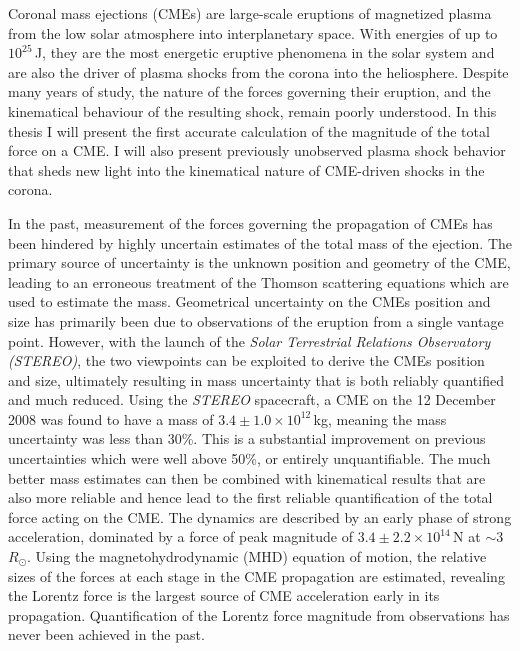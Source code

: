 
\begin{abstracts} 

Coronal mass ejections (CMEs) are large-scale eruptions of magnetized plasma from the low solar atmosphere into interplanetary space. With energies of up to $10^{25}$\,J, they are the most energetic eruptive phenomena in the solar system and are also the driver of plasma shocks from the corona into the heliosphere. Despite many years of study, the nature of the forces governing their eruption, and the kinematical {\color{blue}behaviour} of the resulting shock, remain poorly understood. In this thesis I will present the first accurate calculation of the magnitude of the total force on a CME. I will also present previously unobserved plasma shock behavior that sheds new light into the kinematical nature of CME-driven shocks in the corona.

In the past, measurement of the forces governing the propagation of CMEs has been hindered by highly uncertain estimates of the total mass of the ejection. The primary source of uncertainty is the unknown position and geometry of the CME, leading to an erroneous treatment of the Thomson scattering equations which are used to estimate the mass. Geometrical uncertainty on the CMEs position and size has primarily been due to observations of the eruption from a single vantage point. However, with the launch of the {\it Solar Terrestrial Relations Observatory (STEREO)}, the two viewpoints can be exploited to derive the CMEs position and size, ultimately resulting in mass uncertainty that is both reliably quantified and much reduced. Using the {\it STEREO} spacecraft, a CME on the 12 December 2008 was found to have a mass of $3.4\pm1.0\times10^{12}$\,kg, meaning the mass uncertainty was less than 30\%. This is a substantial improvement on previous uncertainties which were well above 50\%, or entirely unquantifiable. The much better mass estimates can then be combined with kinematical results that are also more reliable and hence lead to the first reliable quantification of the total force acting on the CME. The dynamics are described by an early phase of strong acceleration, dominated by a force of peak magnitude of $3.4\pm2.2\times10^{14}$\,N at $\sim$3\,$R_{\odot}$. Using the magnetohydrodynamic (MHD) equation of motion, the relative sizes of the forces at each stage in the CME propagation are estimated, revealing the Lorentz force is the largest source of CME acceleration early in its propagation. Quantification of the Lorentz force magnitude from observations has never been achieved in the past.



\end{abstracts}
